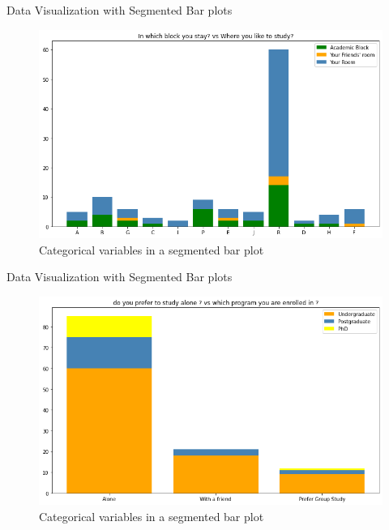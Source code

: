 \documentclass{beamer}
\begin{document}
\begin{frame}
\begin{block}{Data Visualization with Segmented Bar plots}
\begin{figure}[hbtp]
\caption{Categorical variables in a segmented bar plot}
\centering
\includegraphics[scale=0.45]{output2.png}
\end{figure}
\end{block}
\end{frame}

\begin{frame}
\begin{block}{Data Visualization with Segmented Bar plots}
\begin{figure}[hbtp]
\caption{Categorical variables in a segmented bar plot}
\centering
\includegraphics[scale=0.45]{output4.png}
\end{figure}
\end{block}
\end{frame}
\end{document}
